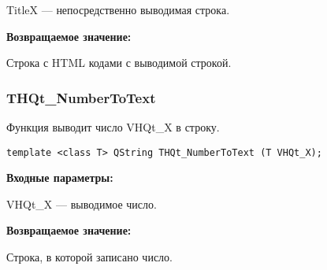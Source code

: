 \documentclass[a4paper,12pt]{article}
\begin{document}
TitleX --- непосредственно выводимая строка.

\textbf{Возвращаемое значение:}

Строка с HTML кодами с выводимой строкой.


\subsubsection{THQt\_NumberToText}\label{THQt_NumberToText}

Функция выводит число VHQt\_X в строку.


\begin{lstlisting}[label=code_syntax_THQt_NumberToText,caption=Синтаксис]
template <class T> QString THQt_NumberToText (T VHQt_X);
\end{lstlisting}

\textbf{Входные параметры:}

VHQt\_X --- выводимое число.

\textbf{Возвращаемое значение:}

Строка, в которой записано число.


\end{document}
